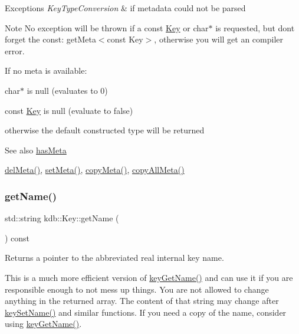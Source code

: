 \begin{DoxyExceptions}{Exceptions}
{\em Key\+Type\+Conversion} & if metadata could not be parsed\\
\hline
\end{DoxyExceptions}
\begin{DoxyNote}{Note}
No exception will be thrown if a const \mbox{\hyperlink{classkdb_1_1Key}{Key}} or char$\ast$ is requested, but don\textquotesingle{}t forget the const\+: get\+Meta$<$const Key$>$, otherwise you will get an compiler error.
\end{DoxyNote}
If no meta is available\+:
\begin{DoxyItemize}
\item char$\ast$ is null (evaluates to 0)
\item const \mbox{\hyperlink{classkdb_1_1Key}{Key}} is null (evaluate to false)
\item otherwise the default constructed type will be returned \begin{DoxySeeAlso}{See also}
\mbox{\hyperlink{classkdb_1_1Key_ae3c3228bd66be9013a8d686e57aed64b}{has\+Meta}}

\mbox{\hyperlink{classkdb_1_1Key_a2305da805095605aca38d53f2733fb57}{del\+Meta()}}, \mbox{\hyperlink{classkdb_1_1Key_a4c5a3d463127ade0b766c4298002daa3}{set\+Meta()}}, \mbox{\hyperlink{classkdb_1_1Key_a53f6d2196a7f17c4bdc544207bdc5f4c}{copy\+Meta()}}, \mbox{\hyperlink{classkdb_1_1Key_aec0910bf293db33deac6a3f81359cb48}{copy\+All\+Meta()}} 
\end{DoxySeeAlso}

\end{DoxyItemize}\mbox{\label{classkdb_1_1Key_a6c1812730e9cb714893c9f9b1e503303}} 
\subsubsection{\texorpdfstring{getName()}{getName()}}
{\footnotesize\ttfamily std\+::string kdb\+::\+Key\+::get\+Name (\begin{DoxyParamCaption}{ }\end{DoxyParamCaption}) const\hspace{0.3cm}{\ttfamily [inline]}}



Returns a pointer to the abbreviated real internal {\ttfamily key} name. 

This is a much more efficient version of \mbox{\hyperlink{group__keyname_gab29a850168d9b31c9529e90cf9ab68be}{key\+Get\+Name()}} and can use it if you are responsible enough to not mess up things. You are not allowed to change anything in the returned array. The content of that string may change after \mbox{\hyperlink{group__keyname_ga7699091610e7f3f43d2949514a4b35d9}{key\+Set\+Name()}} and similar functions. If you need a copy of the name, consider using \mbox{\hyperlink{group__keyname_gab29a850168d9b31c9529e90cf9ab68be}{key\+Get\+Name()}}.

